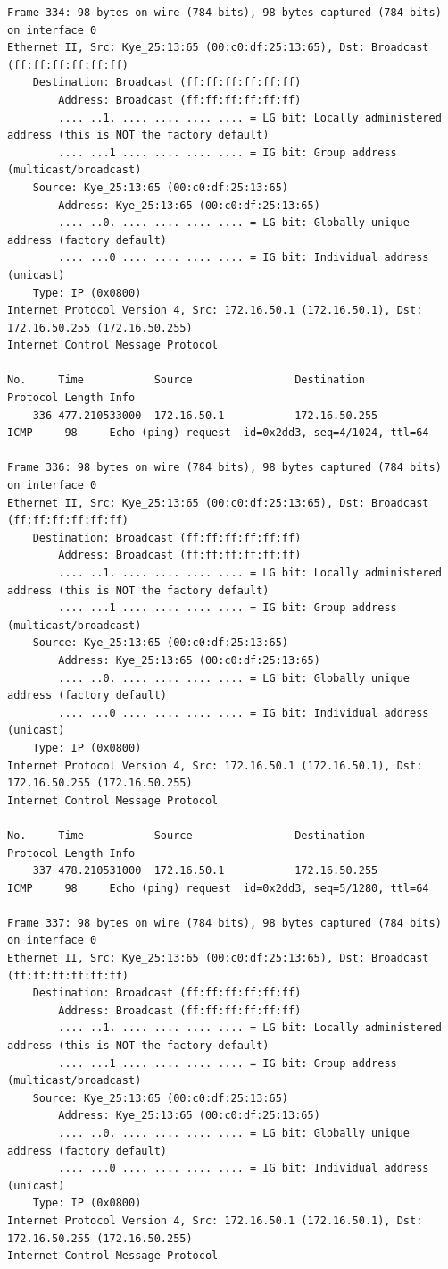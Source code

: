 \documentclass[a4paper,11pt]{article}
\begin{document}
\begin{lstlisting}
Frame 334: 98 bytes on wire (784 bits), 98 bytes captured (784 bits) on interface 0
Ethernet II, Src: Kye_25:13:65 (00:c0:df:25:13:65), Dst: Broadcast (ff:ff:ff:ff:ff:ff)
    Destination: Broadcast (ff:ff:ff:ff:ff:ff)
        Address: Broadcast (ff:ff:ff:ff:ff:ff)
        .... ..1. .... .... .... .... = LG bit: Locally administered address (this is NOT the factory default)
        .... ...1 .... .... .... .... = IG bit: Group address (multicast/broadcast)
    Source: Kye_25:13:65 (00:c0:df:25:13:65)
        Address: Kye_25:13:65 (00:c0:df:25:13:65)
        .... ..0. .... .... .... .... = LG bit: Globally unique address (factory default)
        .... ...0 .... .... .... .... = IG bit: Individual address (unicast)
    Type: IP (0x0800)
Internet Protocol Version 4, Src: 172.16.50.1 (172.16.50.1), Dst: 172.16.50.255 (172.16.50.255)
Internet Control Message Protocol

No.     Time           Source                Destination           Protocol Length Info
    336 477.210533000  172.16.50.1           172.16.50.255         ICMP     98     Echo (ping) request  id=0x2dd3, seq=4/1024, ttl=64

Frame 336: 98 bytes on wire (784 bits), 98 bytes captured (784 bits) on interface 0
Ethernet II, Src: Kye_25:13:65 (00:c0:df:25:13:65), Dst: Broadcast (ff:ff:ff:ff:ff:ff)
    Destination: Broadcast (ff:ff:ff:ff:ff:ff)
        Address: Broadcast (ff:ff:ff:ff:ff:ff)
        .... ..1. .... .... .... .... = LG bit: Locally administered address (this is NOT the factory default)
        .... ...1 .... .... .... .... = IG bit: Group address (multicast/broadcast)
    Source: Kye_25:13:65 (00:c0:df:25:13:65)
        Address: Kye_25:13:65 (00:c0:df:25:13:65)
        .... ..0. .... .... .... .... = LG bit: Globally unique address (factory default)
        .... ...0 .... .... .... .... = IG bit: Individual address (unicast)
    Type: IP (0x0800)
Internet Protocol Version 4, Src: 172.16.50.1 (172.16.50.1), Dst: 172.16.50.255 (172.16.50.255)
Internet Control Message Protocol

No.     Time           Source                Destination           Protocol Length Info
    337 478.210531000  172.16.50.1           172.16.50.255         ICMP     98     Echo (ping) request  id=0x2dd3, seq=5/1280, ttl=64

Frame 337: 98 bytes on wire (784 bits), 98 bytes captured (784 bits) on interface 0
Ethernet II, Src: Kye_25:13:65 (00:c0:df:25:13:65), Dst: Broadcast (ff:ff:ff:ff:ff:ff)
    Destination: Broadcast (ff:ff:ff:ff:ff:ff)
        Address: Broadcast (ff:ff:ff:ff:ff:ff)
        .... ..1. .... .... .... .... = LG bit: Locally administered address (this is NOT the factory default)
        .... ...1 .... .... .... .... = IG bit: Group address (multicast/broadcast)
    Source: Kye_25:13:65 (00:c0:df:25:13:65)
        Address: Kye_25:13:65 (00:c0:df:25:13:65)
        .... ..0. .... .... .... .... = LG bit: Globally unique address (factory default)
        .... ...0 .... .... .... .... = IG bit: Individual address (unicast)
    Type: IP (0x0800)
Internet Protocol Version 4, Src: 172.16.50.1 (172.16.50.1), Dst: 172.16.50.255 (172.16.50.255)
Internet Control Message Protocol


\end{lstlisting}
\end{document}
